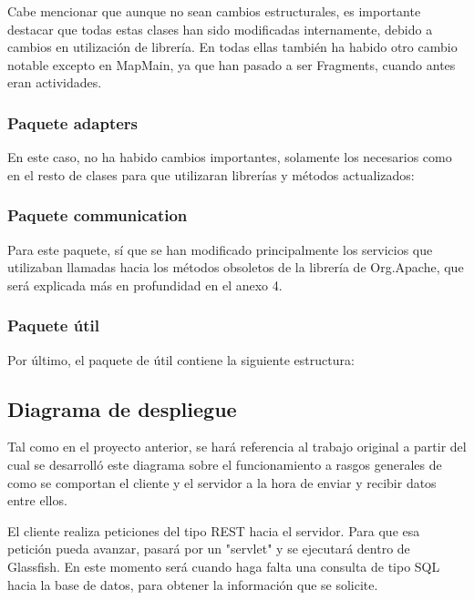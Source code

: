 Cabe mencionar que aunque no sean cambios estructurales, es importante destacar que todas estas clases han sido modificadas internamente, debido a cambios en utilización de librería. En todas ellas también ha habido otro cambio notable excepto en MapMain, ya que han pasado a ser Fragments, cuando antes eran actividades.

\subsubsection{Paquete adapters}

En este caso, no ha habido cambios importantes, solamente los necesarios como en el resto de clases para que utilizaran librerías y métodos actualizados:


\subsubsection{Paquete communication}

Para este paquete, sí que se han modificado principalmente los servicios que utilizaban llamadas hacia los métodos obsoletos de la librería de Org.Apache, que será explicada más en profundidad en el anexo 4.


\subsubsection{Paquete útil}

Por último, el paquete de útil contiene la siguiente estructura:


\subsection{Diagrama de despliegue}

Tal como en el proyecto anterior, se hará referencia al trabajo original \cite{tfg1} a partir del cual se desarrolló este diagrama sobre el funcionamiento a rasgos generales de como se comportan el cliente y el servidor a la hora de enviar y recibir datos entre ellos.

El cliente realiza peticiones del tipo REST hacia el servidor. Para que esa petición pueda avanzar, pasará por un "servlet" y se ejecutará dentro de Glassfish. En este momento será cuando haga falta una consulta de tipo SQL hacia la base de datos, para obtener la información que se solicite.

